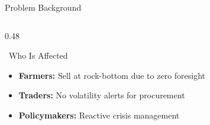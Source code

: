\documentclass{beamer}
\begin{document}
\begin{frame}[label=bg]{Problem Background}
\begin{columns}[T]
\begin{column}{0.48\textwidth}
\vspace{0.08cm}

\begin{successcard}{~Who Is Affected}
\scriptsize
\begin{itemize}\setlength\itemsep{1pt}
  \item \textbf{Farmers:} Sell at rock-bottom due to zero foresight
  \item \textbf{Traders:} No volatility alerts for procurement
  \item \textbf{Policymakers:} Reactive crisis management
\end{itemize}
\end{successcard}

\end{column}
\end{columns}

\end{frame}
\end{document}
